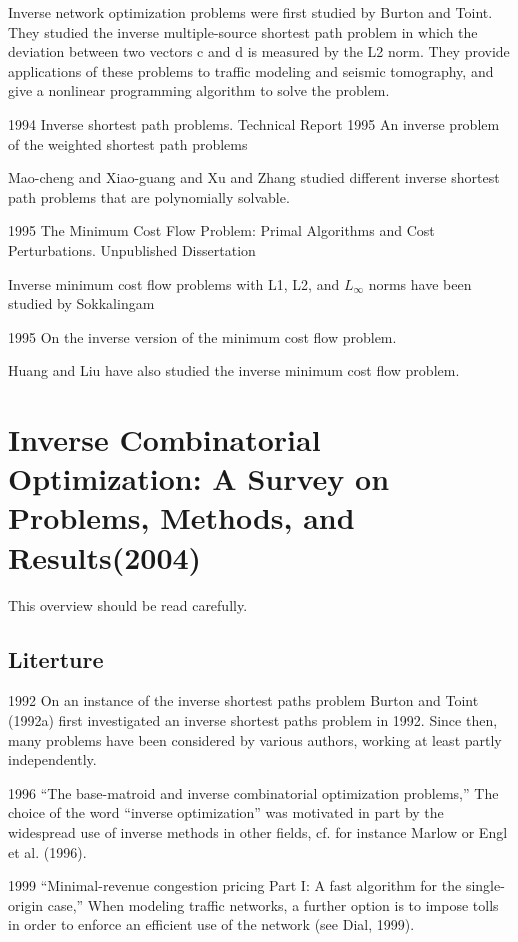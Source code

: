 \documentclass[UTF8]{article}
\begin{document}
Inverse network optimization problems were first studied by Burton and Toint. They studied the inverse multiple-source shortest path problem in which the deviation between two vectors c and d is measured by the L2 norm. They provide applications of these problems to traffic modeling and seismic tomography, and give a nonlinear programming algorithm to solve the problem.


1994 Inverse shortest path problems. Technical Report
1995 An inverse problem of the weighted shortest path problems

Mao-cheng and Xiao-guang and Xu and Zhang studied different inverse shortest path problems that are polynomially solvable.


1995 The Minimum Cost Flow Problem: Primal Algorithms and Cost Perturbations. Unpublished Dissertation

Inverse minimum cost flow problems with L1, L2, and $L_\infty$ norms have been studied by Sokkalingam

1995 On the inverse version of the minimum cost flow problem.

Huang and Liu have also studied the inverse minimum cost flow problem.



\section{Inverse Combinatorial Optimization: A Survey on Problems, Methods, and Results(2004)}

This overview should be read carefully.

\subsection{Literture}

1992 On an instance of the inverse shortest paths problem
Burton and Toint (1992a) first investigated an inverse shortest paths problem in 1992. Since then, many problems have been considered by various authors, working at least partly independently.


1996 “The base-matroid and inverse combinatorial optimization problems,”
The choice of the word “inverse optimization” was motivated in part by the widespread use of inverse methods in other fields, cf. for instance Marlow or Engl et al. (1996).

1999 “Minimal-revenue congestion pricing Part I: A fast algorithm for the single-origin case,”
When modeling traffic networks, a further option is to impose tolls in order to enforce an efficient use of the network (see Dial, 1999).
\end{document}
